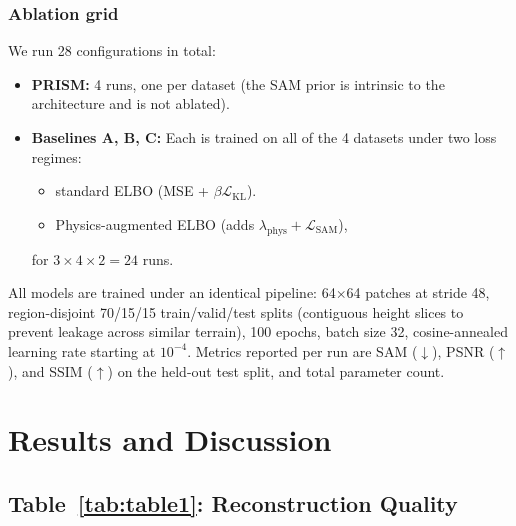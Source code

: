 \documentclass{article} %
\begin{document}
\subsubsection{Ablation grid}

We run 28 configurations in total:

\begin{itemize}
\item \textbf{PRISM:} 4 runs, one per dataset (the SAM prior is intrinsic to the architecture and is not ablated).
\item \textbf{Baselines A, B, C:} Each is trained on all of the 4 datasets under two loss regimes: \begin{itemize}
    \item standard ELBO (MSE + $\beta\mathcal{L}_{\mathrm{KL}}$).
    \item Physics-augmented ELBO (adds $\lambda_{\mathrm{phys}} + \mathcal{L}_{\mathrm{SAM}}$),
\end{itemize}
for $3 \times 4 \times 2 = 24$ runs.
\end{itemize}

All models are trained under an identical pipeline: 64$\times$64 patches at stride 48, region-disjoint 70/15/15 train/valid/test splits (contiguous height slices to prevent leakage across similar terrain), 100 epochs, batch size 32, cosine-annealed learning rate starting at $10^{-4}$. Metrics reported per run are SAM ($\downarrow$), PSNR ($\uparrow$), and SSIM ($\uparrow$) on the held-out test split, and total parameter count.

\section{Results and Discussion}

\subsection{Table~\ref{tab:table1}: Reconstruction Quality}
\end{document}

